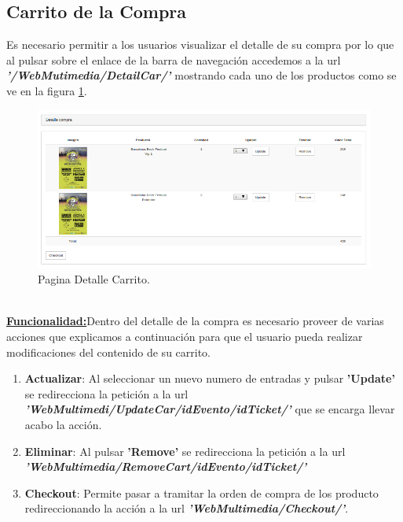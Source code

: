 \subsection*{Carrito de la Compra}
Es necesario permitir a los usuarios visualizar el detalle de su compra por lo que al pulsar sobre el enlace de la barra de navegación accedemos a la url \textit{\textbf{'/WebMutimedia/DetailCar/'}} mostrando cada uno de los productos como se ve en la figura \ref{fig:Detalle_CarShop}. 
\begin{figure}[!h]
  \begin{center}
     \includegraphics[width=0.8\linewidth]{Figures/Detalle_CarShop}
      \decoRule
      \caption[Detalle Carrito]{Pagina Detalle Carrito.}
  \label{fig:Detalle_CarShop}
  \end{center}
\end{figure}
\\\underline{\textbf{Funcionalidad:}}Dentro del detalle de la compra es necesario proveer de varias acciones que explicamos a continuación para que el usuario pueda realizar modificaciones del contenido de su carrito.
\begin{enumerate}
\item \textbf{Actualizar}: Al seleccionar un nuevo numero de entradas y pulsar \textbf{'Update'} se redirecciona la petición a la url \textit{\textbf{'WebMultimedi/UpdateCar/idEvento/idTicket/'}} que se encarga llevar acabo la acción.
\item \textbf{Eliminar}: Al pulsar \textbf{'Remove'} se redirecciona la petición a la url \textit{\textbf{'WebMultimedia/RemoveCart/idEvento/idTicket/'}}
\item \textbf{Checkout}: Permite pasar a tramitar la orden de compra de los producto redireccionando la acción a la url \textit{\textbf{'WebMultimedia/Checkout/'}}.
\end{enumerate}
